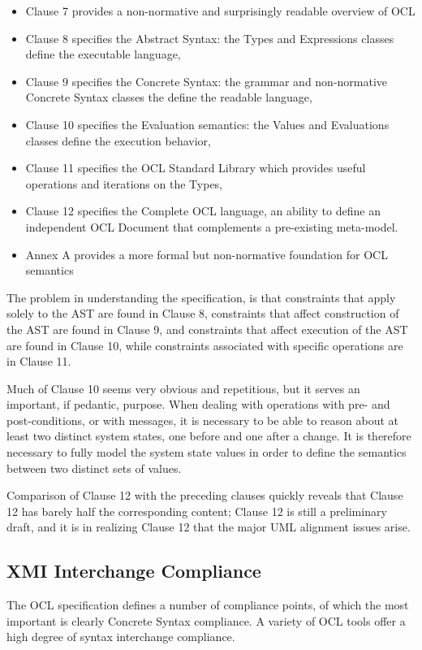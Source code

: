 \documentclass{eceasst}
\begin{document}
\begin{itemize}
\item Clause 7 provides a non-normative and surprisingly readable overview of OCL
\item Clause 8 specifies the Abstract Syntax: the Types and Expressions classes define the executable language, 
\item Clause 9 specifies the Concrete Syntax: the grammar and non-normative Concrete Syntax classes the define the readable language, 
\item Clause 10 specifies the Evaluation semantics: the Values and Evaluations classes define the execution behavior, 
\item Clause 11 specifies the OCL Standard Library which provides useful operations and iterations on the Types, 
\item Clause 12 specifies the Complete OCL language, an ability to define an independent OCL Document that complements a pre-existing meta-model.
\item Annex A provides a more formal but non-normative foundation for OCL semantics
\end{itemize}

The problem in understanding the specification, is that constraints that apply solely to the AST are found in Clause 8, constraints that affect construction of the AST are found in Clause 9, and constraints that affect execution of the AST are found in Clause 10, while constraints associated with specific operations are in Clause 11.

Much of Clause 10 seems very obvious and repetitious, but it serves an important, if pedantic, purpose. When dealing with operations with pre- and post-conditions, or with messages, it is necessary to be able to reason about at least two distinct system states, one before and one after a change. It is therefore necessary to fully model the system state values in order to define the semantics between two distinct sets of values.

Comparison of Clause 12 with the preceding clauses quickly reveals that Clause 12 has barely half the corresponding content; Clause 12 is still a preliminary draft, and it is in realizing Clause 12 that the major UML alignment issues arise.
 
\subsection{XMI Interchange Compliance}

The OCL specification defines a number of compliance points, of which the most important is clearly Concrete Syntax compliance. A variety of OCL tools offer a high degree of syntax interchange compliance.
\end{document}
